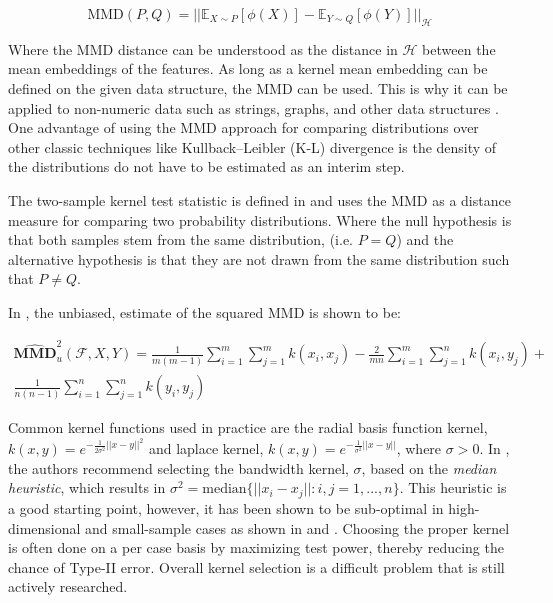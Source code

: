 \begin{equation}
\text{MMD}(P,Q)=|| \mathbb{E}_{X \sim P}[\phi(X)] -  \mathbb{E}_{Y \sim Q}[\phi(Y)]||_\mathcal{H}
\end{equation}

Where the MMD distance can be understood as the distance in $\mathcal{H}$ between the mean embeddings of the features. As long as a kernel mean embedding can be defined on the given data structure, the MMD can be used. This is why it can be applied to non-numeric data such as strings, graphs, and other data structures \cite{hofmann2008kernel}. One advantage of using the MMD approach for comparing distributions over other classic techniques like Kullback–Leibler (K-L) divergence is the density of the distributions do not have to be estimated as an interim step. 

The two-sample kernel test statistic is defined in \cite{gretton2012kernel} and uses the MMD as a distance measure for comparing two probability distributions. Where the null hypothesis is that both samples stem from the same distribution,  (i.e. $P=Q$) and the alternative hypothesis is that they are not drawn from the same distribution such that $P \neq Q$.

In \cite{gretton2012kernel}, the unbiased, estimate of the squared MMD is shown to be:

\begin{equation}
\begin{split}
\widehat{\mathbf{M M D}}_{u}^{2}(\mathcal{F}, X, Y)=\frac{1}{m(m-1)} \sum_{i=1}^m \sum_{ j=1}^{m} k\left(x_{i}, x_{j}\right)-\frac{2}{m n} \sum_{i=1}^m \sum_{ j=1}^{n} k\left(x_{i}, y_{j}\right)+ \\
\frac{1}{n(n-1)} \sum_{i=1}^n \sum_{j=1}^{n} k\left(y_{i}, y_{j}\right)
\end{split}
\end{equation}



Common kernel functions used in practice are the radial basis function kernel, $k(x, y)= e^{-\frac{1}{2\sigma^2}||x-y||^2}$ and laplace kernel, $k(x, y)= e^{-\frac{1}{\sigma^2}||x-y||}$, where $\sigma > 0$. In \cite{gretton2005kernel}, the authors recommend selecting the bandwidth kernel, $\sigma$, based on the \textit{median heuristic}, which results in $\sigma^2=\text{median}\{||x_i-x_j||:i,j = 1,...,n\}$. This heuristic is a good starting point, however, it has been shown to be sub-optimal in high-dimensional and small-sample cases as shown in \cite{muandet2014kernel} and \cite{ramdas2015decreasing}. Choosing the proper kernel is often done on a per case basis by maximizing test power, thereby reducing the chance of Type-II error. Overall kernel selection is a difficult problem that is still actively researched.

